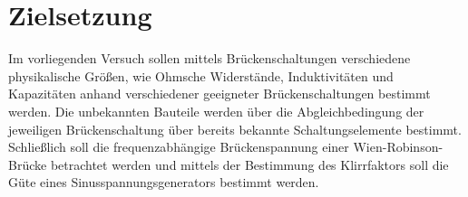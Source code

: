 \section{Zielsetzung}
\label{sec:Zielsetzung}
Im vorliegenden Versuch sollen mittels Brückenschaltungen verschiedene physikalische Größen, wie Ohmsche Widerstände, Induktivitäten und Kapazitäten
anhand verschiedener geeigneter Brückenschaltungen bestimmt werden.
Die unbekannten Bauteile werden über die Abgleichbedingung der jeweiligen Brückenschaltung über bereits bekannte Schaltungselemente bestimmt.
Schließlich soll die frequenzabhängige Brückenspannung einer Wien-Robinson-Brücke betrachtet werden und mittels der Bestimmung des Klirrfaktors soll die Güte
eines Sinusspannungsgenerators bestimmt werden.
